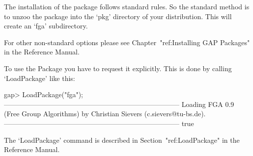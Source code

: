 

\null

The installation of the {\FGA} package follows standard {\GAP} rules.
So the standard method is to unzoo the package into the `pkg'
directory  of your {\GAP} distribution.  This will create an `fga'
subdirectory. 

For other non-standard options please see Chapter~"ref:Installing GAP
Packages" in the {\GAP} Reference Manual.


\null

To use the {\FGA} Package you have to request it explicitly. This  is
done by calling `LoadPackage' like this:

\beginexample
gap> LoadPackage("fga");
-----------------------------------------------------------------------------
Loading  FGA 0.9 (Free Group Algorithms)
by Christian Sievers (c.sievers@tu-bs.de).
-----------------------------------------------------------------------------
true
\endexample

The `LoadPackage' command is described in Section~"ref:LoadPackage"
in the {\GAP} Reference Manual.

